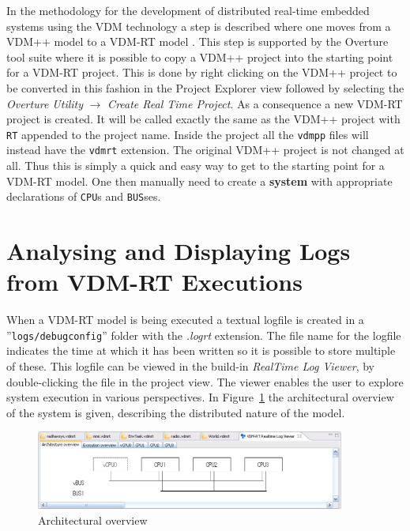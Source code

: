 \documentclass{overturerepsec}
\begin{document}
In the methodology for the development of distributed real-time
embedded systems using the VDM technology a step is described where one
moves from a VDM++ model to a VDM-RT model \cite{Larsen&09b}. This
step is supported by the Overture tool suite where it is possible to
copy a VDM++ project into the starting point for a VDM-RT
project. This is done by right clicking on the VDM++ project to be
converted in this fashion in the Project Explorer view followed by 
selecting the \emph{Overture Utility}
$\rightarrow$ \emph{Create Real Time Project}. As a consequence a new VDM-RT project is
created. It will be called exactly the
same as the VDM++ project with \texttt{RT} appended to the project
name. Inside the project all the \texttt{vdmpp} files will instead
have the \texttt{vdmrt} extension. The original VDM++ project is not
changed at all. Thus this is simply a quick and easy way to get to the
starting point for a VDM-RT model. One then manually need to
create a {\ttfamily\bf system} with appropriate declarations of
\texttt{CPU}s and \texttt{BUS}ses.
 
\section{Analysing and Displaying Logs from VDM-RT Executions}\label{sec:showlog}

When a VDM-RT model is being executed a textual logfile is created in
a ''\texttt{logs/debugconfig}'' folder with the \emph{.logrt} extension. The
file name for the logfile indicates the time at which it has been
written so it is possible to store multiple of these. This logfile can be
viewed in the build-in \emph{RealTime Log Viewer},
by double-clicking the file in the project view. The viewer enables
the user to explore system execution in various perspectives. In
Figure~\ref{fig:userguide:ArchitecturalOverview} the architectural
overview of the system is given, describing the distributed nature of
the model.

\begin{figure}[htp]
\begin{center}
  \includegraphics[width=4in]{figures/ArchitectureOverview}
  \caption{Architectural overview}
  \label{fig:userguide:ArchitecturalOverview}
\end{center}
\end{figure}
\end{document}
